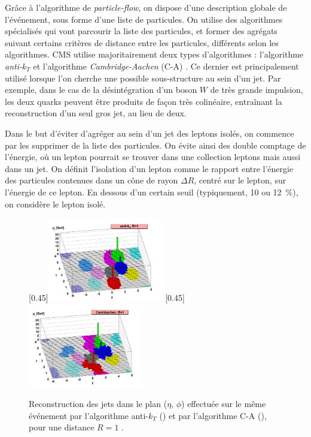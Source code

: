 Grâce à l'algorithme de \emph{particle-flow}, on dispose d'une description globale de l'événement, sous forme d'une liste de particules. On utilise des algorithmes spécialisés qui vont parcourir la liste des particules, et former des agrégats suivant certains critères de distance entre les particules, différents selon les algorithmes. CMS utilise majoritairement deux types d'algorithmes : l'algorithme \emph{anti-$k_T$} \citep{antikt} et l'algorithme \emph{Cambridge-Aachen} (C-A) \citep{ca_jets}. Ce dernier est principalement utilisé lorsque l'on cherche une possible sous-structure au sein d'un jet. Par exemple, dans le cas de la désintégration d'un boson $W$ de très grande impulsion, les deux quarks peuvent être produits de façon très colinéaire, entraînant la reconstruction d'un seul gros jet, au lieu de deux.

Dans le but d'éviter d’agréger au sein d'un jet des leptons isolés, on commence par les supprimer de la liste des particules. On évite ainsi des double comptage de l'énergie, où un lepton pourrait se trouver dans une collection leptons mais aussi dans un jet. On définit l'isolation d'un lepton comme le rapport entre l'énergie des particules contenues dans un cône de rayon $\Delta R$, centré sur le lepton, sur l'énergie de ce lepton. En dessous d'un certain seuil (typiquement, \num{10} ou \SI{12}{\%}), on considère le lepton isolé.

\medskip

\begin{figure}[tbp]
    \centering
    \subcaptionbox{\label{fig:jets_akt}}[0.45\textwidth]{\includegraphics[width=0.45\textwidth]{chapitre3/figs/jets_akt.png}} \hfill
    \subcaptionbox{\label{fig:jets_ca}}[0.45\textwidth]{\includegraphics[width=0.45\textwidth]{chapitre3/figs/jets_ca.png}}
    \caption{Reconstruction des jets dans le plan ($\eta$, $\phi$) effectuée sur le même événement par l'algorithme anti-$k_T$ () et par l'algorithme C-A (), pour une distance $R = 1$ \citep{antikt}.}
    \label{fig:akt_ca}
\end{figure}

